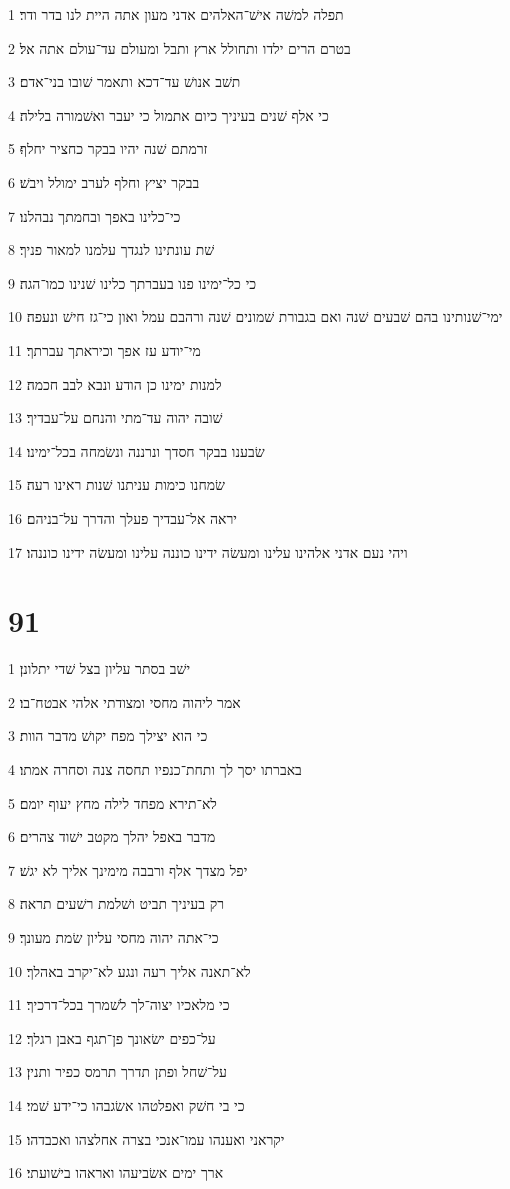 \par 1 תפלה למשׁה אישׁ־האלהים אדני מעון אתה היית לנו בדר ודר׃
\par 2 בטרם הרים ילדו ותחולל ארץ ותבל ומעולם עד־עולם אתה אל׃
\par 3 תשׁב אנושׁ עד־דכא ותאמר שׁובו בני־אדם׃
\par 4 כי אלף שׁנים בעיניך כיום אתמול כי יעבר ואשׁמורה בלילה׃
\par 5 זרמתם שׁנה יהיו בבקר כחציר יחלף׃
\par 6 בבקר יציץ וחלף לערב ימולל ויבשׁ׃
\par 7 כי־כלינו באפך ובחמתך נבהלנו׃
\par 8 שׁת עונתינו לנגדך עלמנו למאור פניך׃
\par 9 כי כל־ימינו פנו בעברתך כלינו שׁנינו כמו־הגה׃
\par 10 ימי־שׁנותינו בהם שׁבעים שׁנה ואם בגבורת שׁמונים שׁנה ורהבם עמל ואון כי־גז חישׁ ונעפה׃
\par 11 מי־יודע עז אפך וכיראתך עברתך׃
\par 12 למנות ימינו כן הודע ונבא לבב חכמה׃
\par 13 שׁובה יהוה עד־מתי והנחם על־עבדיך׃
\par 14 שׂבענו בבקר חסדך ונרננה ונשׂמחה בכל־ימינו׃
\par 15 שׂמחנו כימות עניתנו שׁנות ראינו רעה׃
\par 16 יראה אל־עבדיך פעלך והדרך על־בניהם׃
\par 17 ויהי נעם אדני אלהינו עלינו ומעשׂה ידינו כוננה עלינו ומעשׂה ידינו כוננהו׃

\chapter{91}

\par 1 ישׁב בסתר עליון בצל שׁדי יתלונן׃
\par 2 אמר ליהוה מחסי ומצודתי אלהי אבטח־בו׃
\par 3 כי הוא יצילך מפח יקושׁ מדבר הוות׃
\par 4 באברתו יסך לך ותחת־כנפיו תחסה צנה וסחרה אמתו׃
\par 5 לא־תירא מפחד לילה מחץ יעוף יומם׃
\par 6 מדבר באפל יהלך מקטב ישׁוד צהרים׃
\par 7 יפל מצדך אלף ורבבה מימינך אליך לא יגשׁ׃
\par 8 רק בעיניך תביט ושׁלמת רשׁעים תראה׃
\par 9 כי־אתה יהוה מחסי עליון שׂמת מעונך׃
\par 10 לא־תאנה אליך רעה ונגע לא־יקרב באהלך׃
\par 11 כי מלאכיו יצוה־לך לשׁמרך בכל־דרכיך׃
\par 12 על־כפים ישׂאונך פן־תגף באבן רגלך׃
\par 13 על־שׁחל ופתן תדרך תרמס כפיר ותנין׃
\par 14 כי בי חשׁק ואפלטהו אשׂגבהו כי־ידע שׁמי׃
\par 15 יקראני ואענהו עמו־אנכי בצרה אחלצהו ואכבדהו׃
\par 16 ארך ימים אשׂביעהו ואראהו בישׁועתי׃

